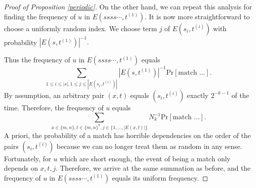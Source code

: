 \documentclass[11pt]{amsart} %
\begin{document}
\begin{proof}[Proof of Proposition \ref{periodic}]
On the other hand, we can repeat this analysis for finding the frequency of $u$ in $E(s s s s \cdots, t^{(1)}).$ It is now more straightforward to choose a uniformly random index. We choose term $j$ of $E(s_i, t^{(i)})$ with probability $|E(s, t^{(1)})|^{-1}.$ 


 Thus the frequency of $u$ in $E(s s s s \cdots, t^{(1)})$ equals
\[ \sum_{1 \le i \le |s|, 1 \le j \le |E(s_i, t^{(i)})|} |E(s, t^{(1)})|^{-1} \text{Pr}[\text{match }\ldots].\]
By assumption, an arbitrary pair $(x,t)$ equals $(s_i, t^{(i)})$ exactly $2^{-k-1}$ of the time. Therefore, the frequency of $u$ equals
 \[ \sum_{x \in \{m, n\}, t \in \{m, n\}^k, j \in \{1, \ldots, |E(x,t)|\}} N_k^{-1} \text{Pr}[\text{match } \ldots].\]
 A priori, the probability of a match has horrible dependencies on the order of the pairs $(s_i, t^{(i)})$ because we can no longer treat them as random in any sense. Fortunately, for $u$ which are short enough, the event of being a match only depends on $x, t, j.$ Therefore, we arrive at the same summation as before, and the frequency of $u$ in $E(s s s s \cdots, t^{(1)})$ equals its uniform frequency.
\end{proof}
%
%
%
\end{document}
